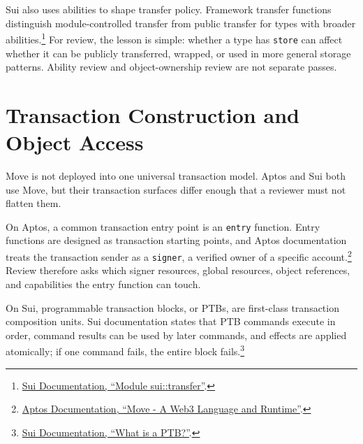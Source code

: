Sui also uses abilities to shape transfer policy. Framework transfer functions distinguish module-controlled transfer from public transfer for types with broader abilities.\footnote{\href{https://docs.sui.io/references/framework/sui_sui/transfer}{Sui Documentation, ``Module sui::transfer''}.} For review, the lesson is simple: whether a type has \texttt{store} can affect whether it can be publicly transferred, wrapped, or used in more general storage patterns. Ability review and object-ownership review are not separate passes.

\section{Transaction Construction and Object Access}

Move is not deployed into one universal transaction model. Aptos and Sui both use Move, but their transaction surfaces differ enough that a reviewer must not flatten them.

On Aptos, a common transaction entry point is an \texttt{entry} function. Entry functions are designed as transaction starting points, and Aptos documentation treats the transaction sender as a \texttt{signer}, a verified owner of a specific account.\footnote{\href{https://aptos.dev/network/blockchain/move}{Aptos Documentation, ``Move - A Web3 Language and Runtime''}.} Review therefore asks which signer resources, global resources, object references, and capabilities the entry function can touch.

On Sui, programmable transaction blocks, or PTBs, are first-class transaction composition units. Sui documentation states that PTB commands execute in order, command results can be used by later commands, and effects are applied atomically; if one command fails, the entire block fails.\footnote{\href{https://docs.sui.io/develop/transactions/ptbs/prog-txn-blocks}{Sui Documentation, ``What is a PTB?''}.}

